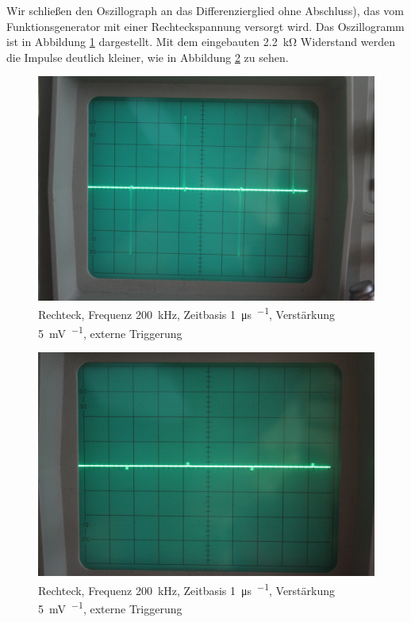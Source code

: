 Wir schließen den Oszillograph an das Differenzierglied ohne Abschluss), das
vom Funktionsgenerator mit einer Rechteckspannung versorgt wird. Das
Oszillogramm ist in Abbildung \ref{fig:0752} dargestellt. Mit dem eingebauten
\SI{2.2}{\kilo\ohm} Widerstand werden die Impulse deutlich kleiner, wie in
Abbildung \ref{fig:0753} zu sehen.

\begin{figure}
	\centering
	\begin{minipage}{.45\linewidth}
	\end{minipage}
	\hfill
	\begin{minipage}{.45\linewidth}
	\includegraphics[width=\linewidth]{Fotos/IMG_0752-1500.jpg}
	\end{minipage}
	\caption{%
		Rechteck, Frequenz \SI{200}{\kilo\hertz}, Zeitbasis \SI{1}{\micro\second\per\division}, Verstärkung \SI{5}{\milli\volt\per\division}, externe Triggerung
	}
	\label{fig:0752}
\end{figure}

\begin{figure}
	\centering
	\begin{minipage}{.45\linewidth}
	\end{minipage}
	\hfill
	\begin{minipage}{.45\linewidth}
	\includegraphics[width=\linewidth]{Fotos/IMG_0753-1500.jpg}
	\end{minipage}
	\caption{%
		Rechteck, Frequenz \SI{200}{\kilo\hertz}, Zeitbasis \SI{1}{\micro\second\per\division}, Verstärkung \SI{5}{\milli\volt\per\division}, externe Triggerung
	}
	\label{fig:0753}
\end{figure}


